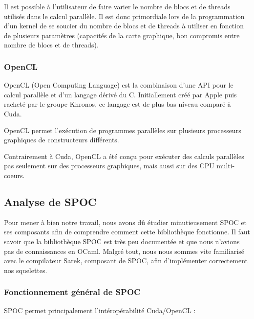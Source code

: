 \documentclass{report}
\begin{document}
Il est possible à l'utilisateur de faire varier le nombre de blocs et de threads utilisés dans le calcul parallèle. Il est donc primordiale lors de la programmation d'un kernel de se soucier du nombre de blocs et de threads à utiliser en fonction de plusieurs paramètres (capacités de la carte graphique, bon compromis entre nombre de blocs et de threads). \newline

\subsubsection{OpenCL}

OpenCL (Open Computing Language) est la combinaison d'une API pour le calcul parallèle et d'un langage dérivé du C. Initiallement créé par Apple puis racheté par le groupe Khronos, ce langage est de plus bas niveau comparé à Cuda. \newline

OpenCL permet l'exécution de programmes parallèles sur plusieurs processeurs graphiques de constructeurs différents. \newline

Contrairement à Cuda, OpenCL a été conçu pour exécuter des calculs parallèles pas seulement sur des processeurs graphiques, mais aussi sur des CPU multi-coeurs. \newline

\subsection{Analyse de SPOC}

Pour mener à bien notre travail, nous avons dû étudier minutieusement SPOC et ses composants afin de comprendre comment cette bibliothèque fonctionne. Il faut savoir que la bibliothèque SPOC est très peu documentée et que nous n'avions pas de connaissances en OCaml.\newline
Malgré tout, nous nous sommes vite familiarisé avec le compilateur Sarek, composant de SPOC, afin d'implémenter correctement nos squelettes. \newline

\subsubsection{Fonctionnement général de SPOC}

SPOC permet principalement l'intéropérabilité Cuda/OpenCL :\newline
\end{document}
